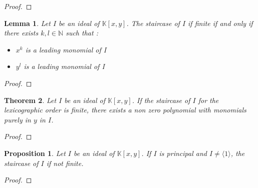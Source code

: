 \documentclass{article}
\newtheorem{theorem}{Theorem}[section]
\newtheorem{lemma}[theorem]{Lemma}
\newtheorem{proposition}{Proposition}[section]
\begin{document}
\begin{proof}
    
\end{proof}

\begin{lemma}
    Let $I$ be an ideal of $\mathbb{K}[x, y]$. The staircase of $I$ if finite if and only if there exists $k, l \in \mathbb{N}$ such that :
    \begin{itemize}
        \item $x^{k}$ is a leading monomial of I
        \item $y^{l}$ is a leading monomial of I
    \end{itemize}
\end{lemma}

\begin{proof}
    
\end{proof}

\begin{theorem}
    Let $I$ be an ideal of $\mathbb{K}[x, y]$. If the staircase of $I$ for the lexicographic order is finite, there exists a non zero polynomial with monomials purely in $y$ in $I$.
\end{theorem}

\begin{proof}
    
\end{proof}

\begin{proposition}
    Let $I$ be an ideal of $\mathbb{K}[x, y]$. If $I$ is principal and $I \neq \langle 1 \rangle$, the staircase of $I$ if not finite. 
\end{proposition}

\begin{proof}
    
\end{proof}
\end{document}
